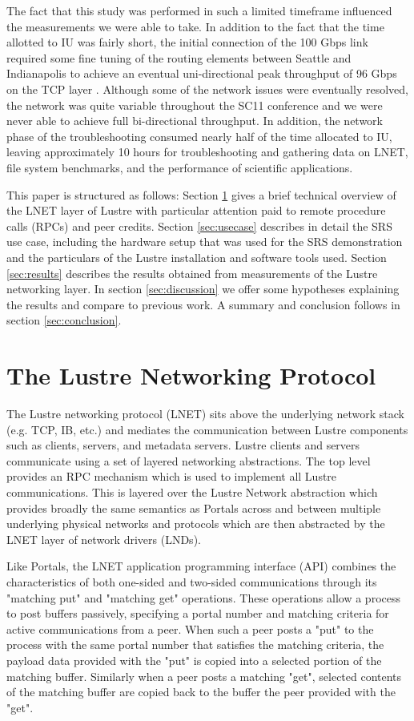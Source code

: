 \documentclass[]{sigplan-proc}
\begin{document}
The fact that this study was performed in such a limited timeframe influenced the measurements we were able to
take. In addition to the fact that the time allotted to IU was fairly short, the initial connection of the 100
Gbps link required some fine tuning of the routing elements between Seattle and Indianapolis to achieve an
eventual uni-directional peak throughput of 96 Gbps on the TCP layer \cite{henschel2012}. Although some of the
network issues were eventually resolved, the network was quite variable throughout the SC11 conference and we
were never able to achieve full bi-directional throughput. In addition, the network phase of the
troubleshooting consumed nearly half of the time allocated to IU, leaving approximately 10 hours for
troubleshooting and gathering data on LNET, file system benchmarks, and the performance of scientific
applications.

This paper is structured as follows: Section \ref{sec:LNET} gives a brief technical overview of the LNET layer
of Lustre with particular attention paid to remote procedure calls (RPCs) and peer credits. Section
\ref{sec:usecase} describes in detail the SRS use case, including the hardware setup that was used for the SRS
demonstration and the particulars of the Lustre installation and software tools used. Section
\ref{sec:results} describes the results obtained from measurements of the Lustre networking layer. In section
\ref{sec:discussion} we offer some hypotheses explaining the results and compare to previous work. A summary and conclusion follows in section \ref{sec:conclusion}.

\section{The Lustre Networking Protocol}\label{sec:LNET}

The Lustre networking protocol (LNET) sits above the underlying network stack (e.g. TCP, IB, etc.) and
mediates the communication between Lustre components such as clients, servers, and metadata servers.  Lustre
clients and servers communicate using a set of layered networking abstractions.  The top level provides an RPC
mechanism which is used to implement all Lustre communications.  This is layered over the Lustre Network
abstraction which provides broadly the same semantics as Portals \cite{portalspec} across and between multiple
underlying physical networks and protocols which are then abstracted by the LNET layer of network drivers (LNDs).

Like Portals, the LNET application programming interface (API) combines the characteristics of both one-sided
and two-sided communications through its "matching put" and "matching get" operations.  These operations allow
a process to post buffers passively, specifying a portal number and matching criteria for active
communications from a peer.  When such a peer posts a "put" to the process with the same portal number that
satisfies the matching criteria, the payload data provided with the "put" is copied into a selected portion of
the matching buffer.  Similarly when a peer posts a matching "get", selected contents of the matching buffer
are copied back to the buffer the peer provided with the "get".
\end{document}
